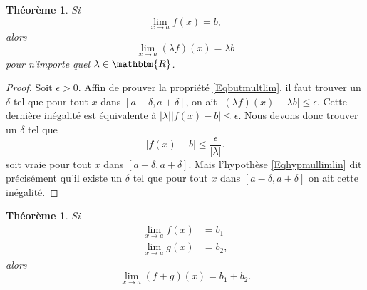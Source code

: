 \documentclass[a4paper,12pt]{book}
\newcommand{\eR}{\mathbbm{R}}
\newcounter{numtho}
\theoremstyle{mes_exemples}	\newtheorem{exemple}[numtho]{Exemple}
\theoremstyle{mes_tho}
\newtheorem{theorem}[numtho]{Théorème}
\begin{document}
\begin{theorem}		\label{ThoLimLinMul}
	Si
	\begin{equation} \label{Eqhypmullimlin}
	  \lim_{x\to a}f(x)=b,
	\end{equation}
	alors
	\begin{equation} \label{Eqbutmultlim}
	  \lim_{x\to a}(\lambda f)(x)=\lambda b
	\end{equation}
	pour n'importe quel $\lambda\in\eR$.
\end{theorem}

\begin{proof}
Soit $\epsilon>0$. Affin de prouver la propriété \eqref{Eqbutmultlim}, il faut trouver un $\delta$ tel que pour tout $x$ dans $[a-\delta,a+\delta]$, on ait $| (\lambda f)(x)- \lambda b |\leq\epsilon$. Cette dernière inégalité est équivalente à $|\lambda|| f(x)-b |\leq\epsilon$. Nous devons donc trouver un $\delta$ tel que 
\begin{equation} 
| f(x)-b |\leq\frac{ \epsilon }{ | \lambda | }.
\end{equation}
soit vraie pour tout $x$ dans $[a-\delta,a+\delta]$. Mais l'hypothèse \eqref{Eqhypmullimlin} dit précisément qu'il existe un $\delta$ tel que pour tout $x$ dans $[a-\delta,a+\delta]$ on ait cette inégalité. 
\end{proof}

\begin{theorem}		\label{ThoLimLin}
	Si
	\begin{subequations}
	\begin{align}
		\lim_{x\to a}f(x)&=b_1\\
		\lim_{x\to a}g(x)&=b_2,
	\end{align}
	\end{subequations}
	alors
	\begin{equation}
		\lim_{x\to a}(f+g)(x)=b_1+b_2.
	\end{equation}
\end{theorem}
\end{document}
